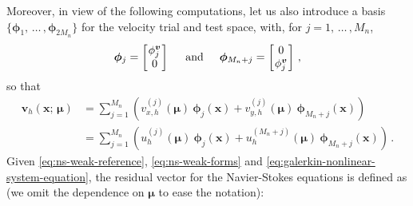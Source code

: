 \documentclass[12pt, a4paper, twoside, openright, notitlepage]{report}
\numberwithin{equation}{chapter}
\theoremstyle{theorem}
\theoremstyle{definition}
\theoremstyle{remark}
\theoremstyle{proposition}
\numberwithin{figure}{chapter}
\newcommand{\bg}[1]{\boldsymbol{#1}}
\begin{document}
		Moreover, in view of the following computations, let us also introduce a basis $\big\lbrace \bg{\phi}_1, \, \ldots \, , \bg{\phi}_{2 M_n} \big\rbrace$ for the velocity trial and test space, with, for $j = 1, \, \ldots \, , M_n$,
		\begin{equation*}
			\bg{\phi}_j = 
			\begin{bmatrix}
			\hspace*{-0.15cm}
			\begin{array}{c} 
				\phi_j^{\bg{v}} \\
				0 
			\end{array} 
			\hspace*{-0.15cm}
			\end{bmatrix} 
			\hspace*{0.5cm} \text{and} \hspace*{0.5cm} \bg{\phi}_{M_n + j} = 
			\begin{bmatrix}
			\hspace*{-0.15cm}
			\begin{array}{c} 
				0 \\
				\phi_j^{\bg{v}}  
			\end{array} 
			\hspace*{-0.15cm}
			\end{bmatrix} \, ,
		\end{equation*}
		so that
		\begin{equation*}
			\begin{aligned}
			\bg{v}_h(\bg{x}; \, \bg{\mu}) & = \sum_{j = 1}^{M_n} \left( v_{x,h}^{(j)}(\bg{\mu}) ~ \bg{\phi}_{j}(\bg{x}) + v_{y,h}^{(j)}(\bg{\mu}) ~ \bg{\phi}_{M_n + j}(\bg{x}) \right) \\
			& = \sum_{j = 1}^{M_n} \left( u_h^{(j)}(\bg{\mu}) ~ \bg{\phi}_{j}(\bg{x}) + u_h^{(M_n + j)}(\bg{\mu}) ~ \bg{\phi}_{M_n + j}(\bg{x}) \right) \, .
			\end{aligned}
		\end{equation*}
		Given \eqref{eq:ns-weak-reference}, \eqref{eq:ns-weak-forms} and \eqref{eq:galerkin-nonlinear-system-equation}, the residual vector for the Navier-Stokes equations is defined as (we omit the dependence on $\bg{\mu}$ to ease the notation): 
\end{document}
